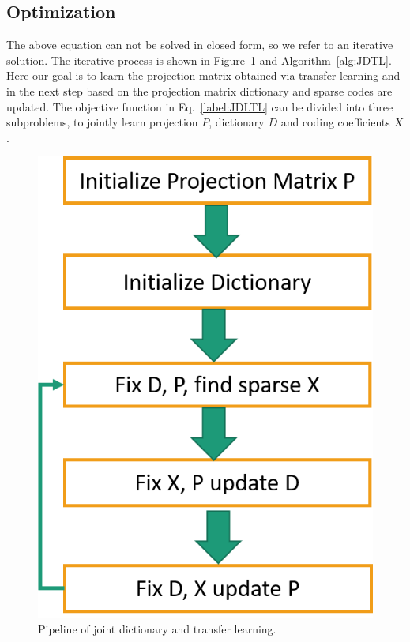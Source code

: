 \subsection{Optimization}
The above equation can not be solved in closed form, so we refer to an iterative solution. The iterative process is shown in Figure~\ref{fig1:novelpipeline} and Algorithm~\ref{alg:JDTL}. Here our goal is to learn the projection matrix obtained via transfer learning and in the next step based on the projection matrix dictionary and sparse codes are updated.
The objective function in Eq.~\eqref{label:JDLTL} can be divided into three subproblems, to jointly learn projection $P$, dictionary $D$ and coding coefficients $X$.

\begin{figure}[!ht]
	\centering
	\includegraphics[width=.22\textheight]{figures/novelpipeline}
	\linebreak
	\caption{Pipeline of joint dictionary and transfer learning.}
	\label{fig1:novelpipeline}
\end{figure}  

